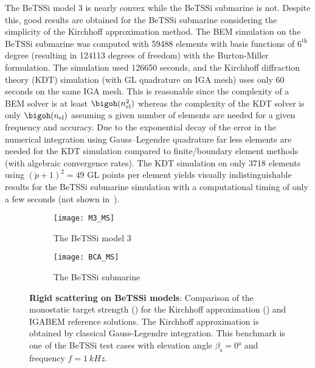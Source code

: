 The BeTSSi model 3 is nearly convex while the BeTSSi submarine is not. Despite this, good results are obtained for the BeTSSi submarine considering the simplicity of the Kirchhoff approximation method. The BEM simulation on the BeTSSi submarine was computed with \num{59488} elements with basis functions of $6^{\mathrm{th}}$ degree (resulting in \num{124113} degrees of freedom) with the Burton-Miller formulation. The simulation used \num{126650} seconds, and the Kirchhoff diffraction theory (KDT) simulation (with GL quadrature on IGA mesh) uses only \num{60} seconds on the same IGA mesh. This is reasonable since the complexity of a BEM solver is at least $\bigoh(n_{\mathrm{el}}^2)$ whereas the complexity of the KDT solver is only $\bigoh(n_{\mathrm{el}})$ assuming a given number of elements are needed for a given frequency and accuracy. Due to the exponential decay of the error in the numerical integration using Gauss--Legendre quadrature far less elements are needed for the KDT simulation compared to finite/boundary element methods (with algebraic convergence rates). The KDT simulation on only 3718 elements using $(\check{p}+1)^2=49$ GL points per element yields visually indistinguishable results for the BeTSSi submarine simulation with a computational timing of only a few seconds (not shown in~).
\begin{figure}
	\centering
	\begin{subfigure}{\textwidth}
		\centering
		\texttt{[image: M3\_MS]}
		\caption{The BeTSSi model 3}
	\end{subfigure}
	\par\bigskip
	\par\bigskip
	\begin{subfigure}{\textwidth}
		\centering
		\texttt{[image: BCA\_MS]}
		\caption{The BeTSSi submarine}
	\end{subfigure}
	\caption{\textbf{Rigid scattering on BeTSSi models}: Comparison of the monostatic target strength () for the Kirchhoff approximation () and IGABEM reference solutions. The Kirchhoff approximation is obtained by classical Gauss-Legendre integration. This benchmark is one of the BeTSSi test cases with elevation angle $\beta_{\mathrm{s}}=\ang{0}$ and frequency $f=\SI{1}{kHz}$.}
	\label{Fig4:BeTSSiresults}
\end{figure}

